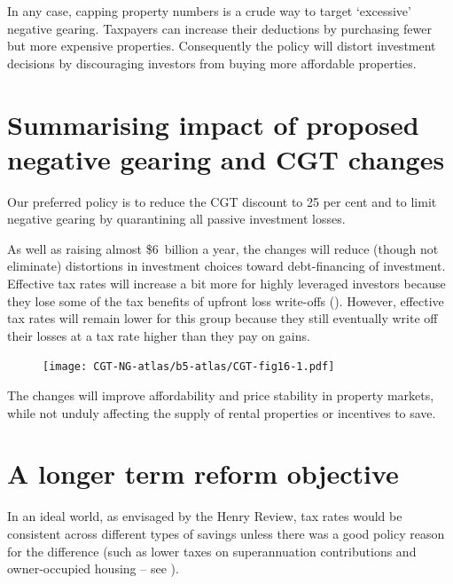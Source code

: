 In any case, capping property numbers is a crude way to target ‘excessive’ negative gearing. Taxpayers can increase their deductions by purchasing fewer but more expensive properties. Consequently the policy will distort investment decisions by discouraging investors from buying more affordable properties. 

\section{Summarising impact of proposed negative gearing and CGT changes}\label{sec:Summarizing-impact-proposed-NG-and-CGT}
Our preferred policy is to reduce the CGT discount to 25 per cent and to limit negative gearing by quarantining all passive investment losses.

As well as raising almost \$6~billion a year, the changes will reduce (though not eliminate) distortions in investment choices toward debt-financing of investment. Effective tax rates will increase a bit more for highly leveraged investors because they lose some of the tax benefits of upfront loss write-offs (). However, effective tax rates will remain lower for this group because they still eventually write off their losses at a tax rate higher than they pay on gains.  

\begin{figure}
\label{fig:16}
\texttt{[image: CGT-NG-atlas/b5-atlas/CGT-fig16-1.pdf]}
\end{figure}

The changes will improve affordability and price stability in property markets, while not unduly affecting the supply of rental properties or incentives to save.

\section{A longer term reform objective}\label{sec:A-longer-term-reform-objective}
In an ideal world, as envisaged by the Henry Review, tax rates would be consistent across different types of savings unless there was a good policy reason for the difference (such as lower taxes on superannuation contributions and owner-occupied housing – see ). 

